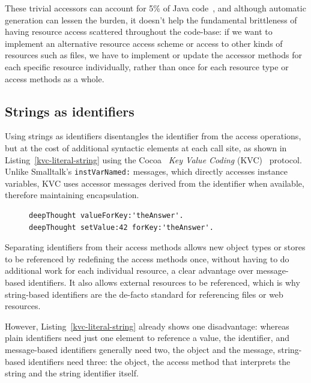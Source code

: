 \documentclass{acm_proc_article-sp}
\begin{document}
These trivial accessors can account for 5\% of Java code~\cite{Spinellis:2002:MPC:510857.510868}, and although 
automatic generation can lessen the burden, it doesn't help the fundamental brittleness of 
having resource access scattered throughout the code-base: if we want to implement an alternative resource access scheme or 
access to other kinds of resources such as files, we  have to implement or update the accessor methods for each specific resource individually,
rather than once for each resource type or access methods as a whole.  


\subsection{Strings as identifiers}
\label{string-identifiers}
Using strings as identifiers disentangles the identifier from the access operations, but at the cost
of additional syntactic elements at each call site, as shown in Listing~\ref{kvc-literal-string} using the Cocoa~\cite{Garfinkel:2002:BCA:560771}
\emph{Key Value Coding} (KVC)~\cite{KVC} protocol.   Unlike Smalltalk's {\tt instVarNamed:} 
messages, which directly accesses instance variables, KVC uses accessor messages derived
from the identifier when available, therefore maintaining encapsulation.

\begin{figure}[htbp]
\begin{lstlisting}[style=numbers,label=kvc-literal-string,caption=Retrieve and store value via string identifier.]
deepThought valueForKey:'theAnswer'.
deepThought setValue:42 forKey:'theAnswer'.
\end{lstlisting}
\end{figure}

Separating identifiers from their access methods allows new object types or stores to be referenced by redefining
the access methods once, without having to do additional work for each individual resource, a clear advantage
over message-based identifiers.  It also allows external resources to be referenced, which is why string-based
identifiers are the de-facto standard for referencing files or web resources.

 However, Listing~\ref{kvc-literal-string} already shows one disadvantage:  whereas
plain identifiers need just one element to reference a value, the identifier, and message-based identifiers generally need two,
the object and the message, string-based identifiers need three:  the object, the access method that interprets the
string and the string identifier itself.
\end{document}
